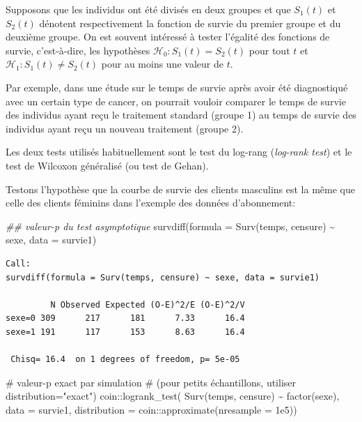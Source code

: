 \documentclass[
  11pt,
  letterpaper,
]{book}
\newenvironment{Shaded}{\begin{snugshade}}{\end{snugshade}}
\newcommand{\AttributeTok}[1]{\textcolor[rgb]{0.40,0.45,0.13}{#1}}
\newcommand{\CommentTok}[1]{\textcolor[rgb]{0.37,0.37,0.37}{#1}}
\newcommand{\DocumentationTok}[1]{\textcolor[rgb]{0.37,0.37,0.37}{\textit{#1}}}
\newcommand{\FloatTok}[1]{\textcolor[rgb]{0.68,0.00,0.00}{#1}}
\newcommand{\FunctionTok}[1]{\textcolor[rgb]{0.28,0.35,0.67}{#1}}
\newcommand{\NormalTok}[1]{\textcolor[rgb]{0.00,0.23,0.31}{#1}}
\newcommand{\SpecialCharTok}[1]{\textcolor[rgb]{0.37,0.37,0.37}{#1}}
\theoremstyle{definition}
\theoremstyle{remark}
\begin{document}
Supposons que les individus ont été divisés en deux groupes et que
\(S_1(t)\) et \(S_2(t)\) dénotent respectivement la fonction de survie
du premier groupe et du deuxième groupe. On est souvent intéressé à
tester l'égalité des fonctions de survie, c'est-à-dire, les hypothèses
\(\mathscr{H}_0: S_1(t) = S_2(t)\) pour tout \(t\) et
\(\mathscr{H}_1: S_1(t) \neq S_2(t)\) pour au moins une valeur de \(t\).

Par exemple, dans une étude sur le temps de survie après avoir été
diagnostiqué avec un certain type de cancer, on pourrait vouloir
comparer le temps de survie des individus ayant reçu le traitement
standard (groupe 1) au temps de survie des individus ayant reçu un
nouveau traitement (groupe 2).

Les deux tests utilisés habituellement sont le test du log-rang
(\emph{log-rank test}) et le test de Wilcoxon généralisé (ou test de
Gehan).

Testons l'hypothèse que la courbe de survie des clients masculins est la
même que celle des clients féminins dans l'exemple des données
d'abonnement:

\begin{Shaded}
\begin{Highlighting}[]
\DocumentationTok{\#\# valeur{-}p du test asymptotique}
\FunctionTok{survdiff}\NormalTok{(}\AttributeTok{formula =} \FunctionTok{Surv}\NormalTok{(temps, censure) }\SpecialCharTok{\textasciitilde{}}\NormalTok{ sexe, }
         \AttributeTok{data =}\NormalTok{ survie1)}
\end{Highlighting}
\end{Shaded}

\begin{verbatim}
Call:
survdiff(formula = Surv(temps, censure) ~ sexe, data = survie1)

         N Observed Expected (O-E)^2/E (O-E)^2/V
sexe=0 309      217      181      7.33      16.4
sexe=1 191      117      153      8.63      16.4

 Chisq= 16.4  on 1 degrees of freedom, p= 5e-05 
\end{verbatim}

\begin{Shaded}
\begin{Highlighting}[]
\CommentTok{\# valeur{-}p exact par simulation}
\CommentTok{\# (pour petits échantillons, utiliser distribution="exact")}
\NormalTok{coin}\SpecialCharTok{::}\FunctionTok{logrank\_test}\NormalTok{(}
  \FunctionTok{Surv}\NormalTok{(temps, censure) }\SpecialCharTok{\textasciitilde{}} \FunctionTok{factor}\NormalTok{(sexe), }
  \AttributeTok{data =}\NormalTok{ survie1, }
  \AttributeTok{distribution =}\NormalTok{ coin}\SpecialCharTok{::}\FunctionTok{approximate}\NormalTok{(}\AttributeTok{nresample =} \FloatTok{1e5}\NormalTok{))}
\end{Highlighting}
\end{Shaded}
\end{document}
